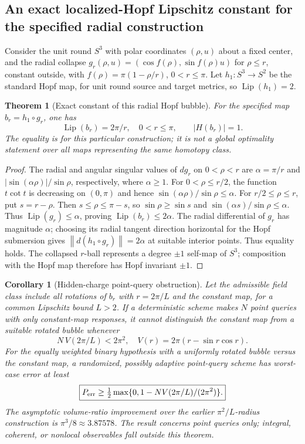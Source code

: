 \documentclass[aps,prd,onecolumn,notitlepage,11pt,superscriptaddress,longbibliography]{revtex4-2}
\newtheorem{theorem}{Theorem}
\newtheorem{corollary}{Corollary}
\newcommand{\norm}[1]{\left\lVert#1\right\rVert}
\begin{document}
\subsection{An exact localized-Hopf Lipschitz constant for the specified radial construction}
Consider the unit round $S^3$ with polar coordinates $(\rho,u)$ about a fixed center, and the radial collapse $g_r(\rho,u)=(\cos f(\rho),\sin f(\rho)u)$ for $\rho\le r$, constant outside, with $f(\rho)=\pi(1-\rho/r)$, $0<r\le\pi$. Let $h_1:S^3\to S^2$ be the standard Hopf map, for unit round source and target metrics, so $\operatorname{Lip}(h_1)=2$.
\begin{theorem}[Exact constant of this radial Hopf bubble]\label{th:v7bubble}
For the specified map $b_r=h_1\circ g_r$, one has
\begin{equation}\boxed{\operatorname{Lip}(b_r)=2\pi/r,\quad 0<r\le\pi,\qquad |H(b_r)|=1.}\end{equation}
The equality is for this \emph{particular construction}; it is not a global optimality statement over all maps representing the same homotopy class.
\end{theorem}
\begin{proof}
The radial and angular singular values of $dg_r$ on $0<\rho<r$ are $\alpha=\pi/r$ and $|\sin(\alpha\rho)|/\sin\rho$, respectively, where $\alpha\ge1$. For $0<\rho\le r/2$, the function $t\cot t$ is decreasing on $(0,\pi)$ and hence $\sin(\alpha\rho)/\sin\rho\le\alpha$. For $r/2\le\rho\le r$, put $s=r-\rho$. Then $s\le\rho\le\pi-s$, so $\sin\rho\ge\sin s$ and $\sin(\alpha s)/\sin\rho\le\alpha$. Thus $\operatorname{Lip}(g_r)\le\alpha$, proving $\operatorname{Lip}(b_r)\le2\alpha$. The radial differential of $g_r$ has magnitude $\alpha$; choosing its radial tangent direction horizontal for the Hopf submersion gives $\norm{d(h_1\circ g_r)}=2\alpha$ at suitable interior points. Thus equality holds. The collapsed $r$-ball represents a degree $\pm1$ self-map of $S^3$; composition with the Hopf map therefore has Hopf invariant $\pm1$.
\end{proof}
\begin{corollary}[Hidden-charge point-query obstruction]\label{cor:v7minimax}
Let the admissible field class include all rotations of $b_r$ with $r=2\pi/L$ and the constant map, for a common Lipschitz bound $L>2$. If a deterministic scheme makes $N$ point queries with only constant-map responses, it cannot distinguish the constant map from a suitable rotated bubble whenever
\begin{equation}\boxed{N\,V(2\pi/L)<2\pi^2,\quad V(r)=2\pi(r-\sin r\cos r).}\end{equation}
For the equally weighted binary hypothesis with a uniformly rotated bubble versus the constant map, a randomized, possibly adaptive point-query scheme has worst-case error at least
\begin{equation}\boxed{P_{\rm err}\ge\tfrac12\max\{0,1-NV(2\pi/L)/(2\pi^2)\}.}\end{equation}
The asymptotic volume-ratio improvement over the earlier $\pi^2/L$-radius construction is $\pi^3/8\approx3.87578$. The result concerns \emph{point queries only}; integral, coherent, or nonlocal observables fall outside this theorem.
\end{corollary}
\end{document}
